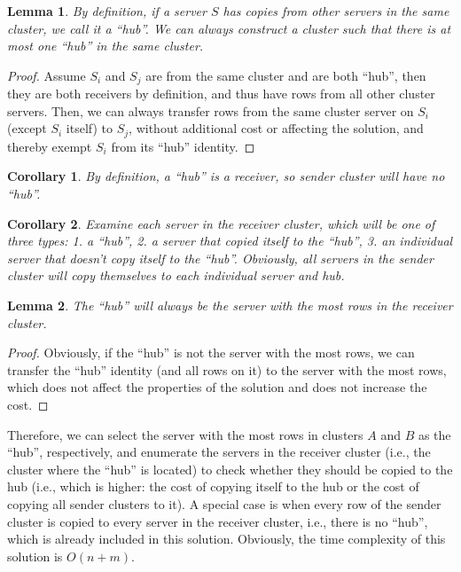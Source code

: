 \documentclass[11pt, a4paper, oneside]{memoir}
\newtheorem{lemma}{Lemma}
\newtheorem{corollary}{Corollary}
\begin{document}
\begin{lemma}
  By definition, if a server $S$ has copies from other servers in the same cluster,
  we call it a ``hub''. We can always construct a cluster such that there is at most one ``hub'' in the same cluster.
\end{lemma}
\begin{proof}
  Assume $S_i$ and $S_j$ are from the same cluster and are both ``hub'',
  then they are both receivers by definition, and thus have rows from all other cluster servers.
  Then, we can always transfer rows from the same cluster server on $S_i$ (except $S_i$ itself) to $S_j$,
  without additional cost or affecting the solution, and thereby exempt $S_i$ from its ``hub'' identity.
\end{proof}

\begin{corollary}
  By definition, a ``hub'' is a receiver, so sender cluster will have no ``hub''.
\end{corollary}

\begin{corollary}
  Examine each server in the receiver cluster, which will be one of three types:
  1. a ``hub'', 2. a server that copied itself to the ``hub'',
  3. an individual server that doesn't copy itself to the ``hub''.
  Obviously, all servers in the sender cluster will copy themselves to each individual server and hub.
\end{corollary}

\begin{lemma}
  The ``hub'' will always be the server with the most rows in the receiver cluster.
\end{lemma}
\begin{proof}
  Obviously, if the ``hub'' is not the server with the most rows,
  we can transfer the ``hub'' identity (and all rows on it) to the server with the most rows,
  which does not affect the properties of the solution and does not increase the cost.
\end{proof}

Therefore, we can select the server with the most rows in clusters $A$ and $B$ as the ``hub'', respectively,
and enumerate the servers in the receiver cluster (i.e., the cluster where the ``hub'' is located)
to check whether they should be copied to the hub (i.e., which is higher: the cost of copying itself to the hub
or the cost of copying all sender clusters to it).
A special case is when every row of the sender cluster is copied to every server in the receiver cluster,
i.e., there is no ``hub'', which is already included in this solution.
Obviously, the time complexity of this solution is $O(n+m)$.
\end{document}
